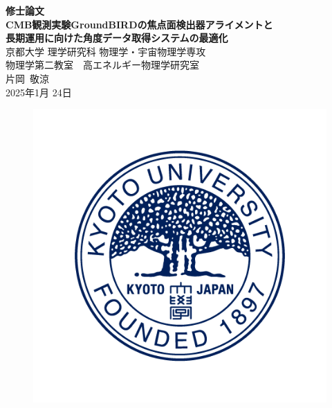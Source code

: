 \thispagestyle{empty}
\begin{center}
\vspace*{1cm}
{\LARGE {\bf {\rm 修士論文} } }\\
\vspace*{1.5cm}
\setlength{\baselineskip}{1cm}
{\Large {\bf {\rm CMB観測実験GroundBIRDの焦点面検出器アライメントと\\
長期運用に向けた角度データ取得システムの最適化
}}}\\
\vspace{1.5cm}
{\Large 京都大学 理学研究科 物理学・宇宙物理学専攻}\\
{\Large 物理学第二教室　高エネルギー物理学研究室}\\
\vspace{1.5cm}
{\Large 片岡~敬涼}\\
\vspace{0.5cm}
{\Large 2025年1月 24日}
\begin{figure}[h]
 \centering
 \includegraphics[width=0.6\columnwidth]{0_title/E-C.png}
\end{figure}



\end{center}
